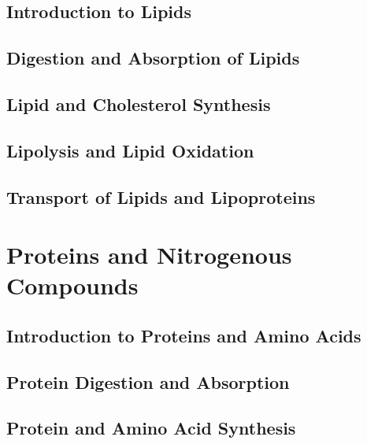 \documentclass{tufte-book}
\begin{document}
\chapter{Introduction to Lipids}\label{ch:lipid-intro}


\chapter{Digestion and Absorption of Lipids}\label{ch:lipid-digestion}


\chapter{Lipid and Cholesterol Synthesis}\label{ch:lipid-synthesis}


\chapter{Lipolysis and Lipid Oxidation}\label{ch:lipid-oxidation}


\chapter{Transport of Lipids and Lipoproteins}\label{ch:lipid-transport}


\part{Proteins and Nitrogenous Compounds}

\chapter{Introduction to Proteins and Amino Acids}\label{ch:intro-proteins}


\chapter{Protein Digestion and Absorption}\label{ch:protein-digestion}


\chapter{Protein and Amino Acid Synthesis}\label{ch:protein-synthesis}

\end{document}
